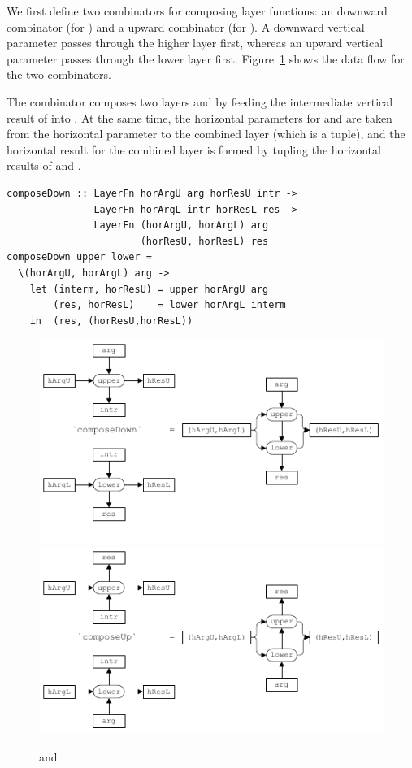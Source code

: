 \documentclass[preprint,natbib]{sigplanconf}
\begin{document}
We first define two combinators for composing layer functions: an downward combinator  (for ) and a upward combinator  (for ). A downward vertical parameter passes through the higher layer first, whereas an upward vertical parameter passes through the lower layer first. Figure~\ref{composeDownUp} shows the data flow for the two combinators. 

The combinator  composes two layers  and  by feeding the intermediate vertical result of  into . At the same time, the horizontal parameters for  and  are taken from the horizontal parameter to the combined layer (which is a tuple), and the horizontal result for the combined layer is formed by tupling the horizontal results of  and . 


\begin{small}
\begin{verbatim}
composeDown :: LayerFn horArgU arg horResU intr ->
               LayerFn horArgL intr horResL res ->
               LayerFn (horArgU, horArgL) arg 
                       (horResU, horResL) res
composeDown upper lower = 
  \(horArgU, horArgL) arg ->                                           
    let (interm, horResU) = upper horArgU arg
        (res, horResL)    = lower horArgL interm            
    in  (res, (horResU,horResL))
\end{verbatim}
\end{small}

\begin{figure}
\includegraphics[width=\columnwidth]{images/ComposeDown}
\includegraphics[width=\columnwidth]{images/ComposeUp}
\caption{ and } \label{composeDownUp} 
\end{figure}
\end{document}
